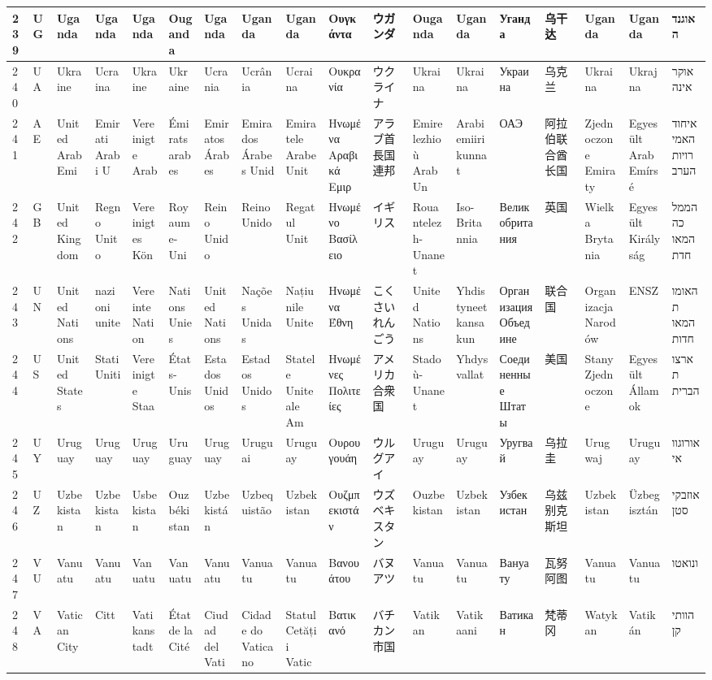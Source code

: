\begin{longtable}{|l|l|l|l|l|l|l|l|l|l|l|l|l|l|l|l|l|l|}
239 & UG & Uganda & Uganda & Uganda & Ouganda & Uganda & Uganda & Uganda & Ουγκάντα & ウガンダ & Ouganda & Uganda & Уганда & 乌干达 & Uganda & Uganda & אוגנדה \\ \hline 
240 & UA & Ukraine & Ucraina & Ukraine & Ukraine & Ucrania & Ucrânia & Ucraina & Ουκρανία & ウクライナ & Ukraina & Ukraina & Украина & 乌克兰 & Ukraina & Ukrajna & אוקראינה \\ \hline 
241 & AE & United Arab Emi & Emirati Arabi U & Vereinigte Arab & Émirats arabes  & Emiratos Árabes & Emirados Árabes Unid & Emiratele Arabe Unit & Ηνωμένα Αραβικά Εμιρ & アラブ首長国連邦 & Emirelezhioù Arab Un & Arabiemiirikunnat & ОАЭ & 阿拉伯联合酋长国 & Zjednoczone Emiraty  & Egyesült Arab Emírsé & איחוד האמירויות הערב \\ \hline 
242 & GB & United Kingdom & Regno Unito & Vereinigtes Kön & Royaume-Uni & Reino Unido & Reino Unido & Regatul Unit & Ηνωμένο Βασίλειο & イギリス & Rouantelezh-Unanet & Iso-Britannia & Великобритания & 英国 & Wielka Brytania & Egyesült Királyság & הממלכה המאוחדת \\ \hline 
243 & UN & United Nations & nazioni unite & Vereinte Nation & Nations Unies & United Nations & Nações Unidas & Națiunile Unite & Ηνωμένα Έθνη & こくさいれんごう & United Nations & Yhdistyneet kansakun & Организация Объедине & 联合国 & Organizacja Narodów  & ENSZ & האומות המאוחדות \\ \hline 
244 & US & United States & Stati Uniti & Vereinigte Staa & États-Unis & Estados Unidos & Estados Unidos & Statele Unite ale Am & Ηνωμένες Πολιτείες & アメリカ合衆国 & Stadoù-Unanet & Yhdysvallat & Соединенные Штаты & 美国 & Stany Zjednoczone & Egyesült Államok & ארצות הברית \\ \hline 
245 & UY & Uruguay & Uruguay & Uruguay & Uruguay & Uruguay & Uruguai & Uruguay & Ουρουγουάη & ウルグアイ & Uruguay & Uruguay & Уругвай & 乌拉圭 & Urugwaj & Uruguay & אורוגוואי \\ \hline 
246 & UZ & Uzbekistan & Uzbekistan & Usbekistan & Ouzbékistan & Uzbekistán & Uzbequistão & Uzbekistan & Ουζμπεκιστάν & ウズベキスタン & Ouzbekistan & Uzbekistan & Узбекистан & 乌兹别克斯坦 & Uzbekistan & Üzbegisztán & אוזבקיסטן \\ \hline 
247 & VU & Vanuatu & Vanuatu & Vanuatu & Vanuatu & Vanuatu & Vanuatu & Vanuatu & Βανουάτου & バヌアツ & Vanuatu & Vanuatu & Вануату & 瓦努阿图 & Vanuatu & Vanuatu & ונואטו \\ \hline 
248 & VA & Vatican City & Citt & Vatikanstadt & État de la Cité & Ciudad del Vati & Cidade do Vaticano & Statul Cetății Vatic & Βατικανό & バチカン市国 & Vatikan & Vatikaani & Ватикан & 梵蒂冈 & Watykan & Vatikán & הוותיקן \\ \hline 

\end{longtable}
